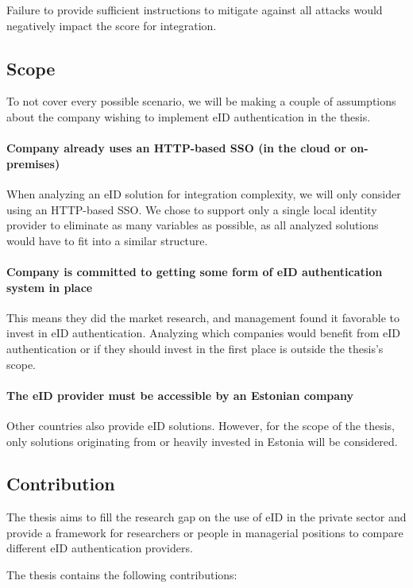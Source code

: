 Failure to provide sufficient instructions to mitigate against all attacks would negatively impact the score for integration.

\subsection{Scope}

To not cover every possible scenario, we will be making a couple of assumptions about the company wishing to implement eID authentication in the thesis.

\paragraph{Company already uses an HTTP-based SSO (in the cloud or on-premises)} When analyzing an eID solution for integration complexity, we will only consider using an HTTP-based SSO. We chose to support only a single local identity provider to eliminate as many variables as possible, as all analyzed solutions would have to fit into a similar structure.

\paragraph{Company is committed to getting some form of eID authentication system in place} This means they did the market research, and management found it favorable to invest in eID authentication. Analyzing which companies would benefit from eID authentication or if they should invest in the first place is outside the thesis's scope.

\paragraph{The eID provider must be accessible by an Estonian company} Other countries also provide eID solutions. However, for the scope of the thesis, only solutions originating from or heavily invested in Estonia will be considered.


\subsection{Contribution}

The thesis aims to fill the research gap on the use of eID in the private sector and provide a framework for researchers or people in managerial positions to compare different eID authentication providers.

The thesis contains the following contributions:


